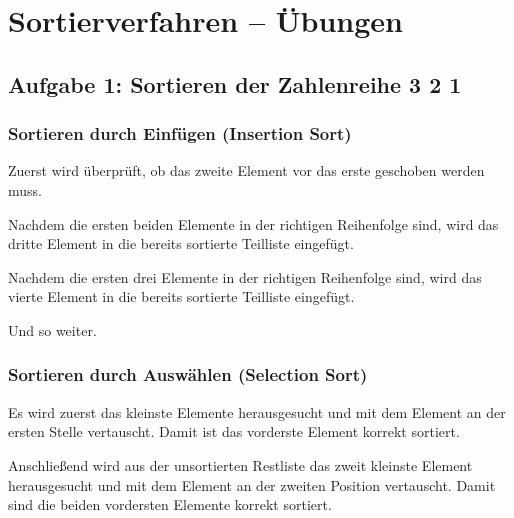 \clearpage

\rehead[]{\textcolor{lightblue}{AvHG, Inf, My}}
\lohead[]{\textcolor{lightblue}{AvHG, Inf, My}}

\section{Sortierverfahren -- Übungen}

\subsection{Aufgabe 1: Sortieren der Zahlenreihe  3 2 1\grqq}

\subsubsection{Sortieren durch Einfügen (Insertion Sort)}

Zuerst wird überprüft, ob das zweite Element vor das erste geschoben werden
muss.

Nachdem die ersten beiden Elemente in der richtigen Reihenfolge sind, wird das
dritte Element in die bereits sortierte Teilliste eingefügt.

Nachdem die ersten drei Elemente in der richtigen Reihenfolge sind, wird das
vierte Element in die bereits sortierte Teilliste eingefügt.

Und so weiter.

\subsubsection{Sortieren durch Auswählen (Selection Sort)}

Es wird zuerst das kleinste Elemente herausgesucht und mit dem Element an der
ersten Stelle vertauscht. Damit ist das vorderste Element korrekt sortiert.

Anschließend wird aus der unsortierten Restliste das zweit kleinste Element
herausgesucht und mit dem Element an der zweiten Position vertauscht. Damit
sind die beiden vordersten Elemente korrekt sortiert.

